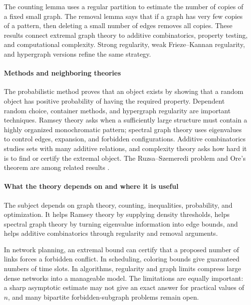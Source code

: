 The counting lemma uses a regular partition to estimate the number of copies of a fixed small graph. The removal lemma says that if a graph has very few copies of a pattern, then deleting a small number of edges removes all copies. These results connect extremal graph theory to additive combinatorics, property testing, and computational complexity. Strong regularity, weak Frieze--Kannan regularity, and hypergraph versions refine the same strategy.

\paragraph{Methods and neighboring theories}
The probabilistic method proves that an object exists by showing that a random object has positive probability of having the required property. Dependent random choice, container methods, and hypergraph regularity are important techniques. Ramsey theory asks when a sufficiently large structure must contain a highly organized monochromatic pattern; spectral graph theory uses eigenvalues to control edges, expansion, and forbidden configurations. Additive combinatorics studies sets with many additive relations, and complexity theory asks how hard it is to find or certify the extremal object. The Ruzsa--Szemeredi problem and Ore's theorem are among related results \cite{extremal_graph_theory_ref1,extremal_graph_theory_ref6}.

\paragraph{What the theory depends on and where it is useful}
The subject depends on graph theory, counting, inequalities, probability, and optimization. It helps Ramsey theory by supplying density thresholds, helps spectral graph theory by turning eigenvalue information into edge bounds, and helps additive combinatorics through regularity and removal arguments.

In network planning, an extremal bound can certify that a proposed number of links forces a forbidden conflict. In scheduling, coloring bounds give guaranteed numbers of time slots. In algorithms, regularity and graph limits compress large dense networks into a manageable model. The limitations are equally important: a sharp asymptotic estimate may not give an exact answer for practical values of $n$, and many bipartite forbidden-subgraph problems remain open.

